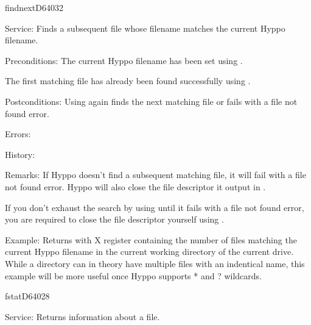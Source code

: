 %
\newpage
\begin{hyppotrap}{findnext}{D640}{32}
\item [Service:]
  Finds a subsequent file whose filename matches the current Hyppo filename.
\item [Preconditions:]
  The current Hyppo filename has been set using .

  The first matching file has already been found successfully using
  .
\item [Postconditions:]
  Using  again finds the next matching file or fails with a
  file not found error.
\item [Errors:]
\item [History:]
\item [Remarks:]
  If Hyppo doesn't find a subsequent matching file, it will fail with a
  file not found error. Hyppo will also close the file descriptor it
  output in .

  If you don't exhaust the search by using  until it fails
  with a file not found error, you are required to close the file descriptor
  yourself using .
\item [Example:]
  Returns with X register containing the number of files matching the current
  Hyppo filename in the current working directory of the current drive. While
  a directory can in theory have multiple files with an indentical name, this
  example will be more useful once Hyppo supports * and ? wildcards.
\end{hyppotrap}


\newpage
\begin{hyppotrap}{fstat}{D640}{28}
\item [Service:]
  Returns information about a file.
\notimplemented
\end{hyppotrap}


